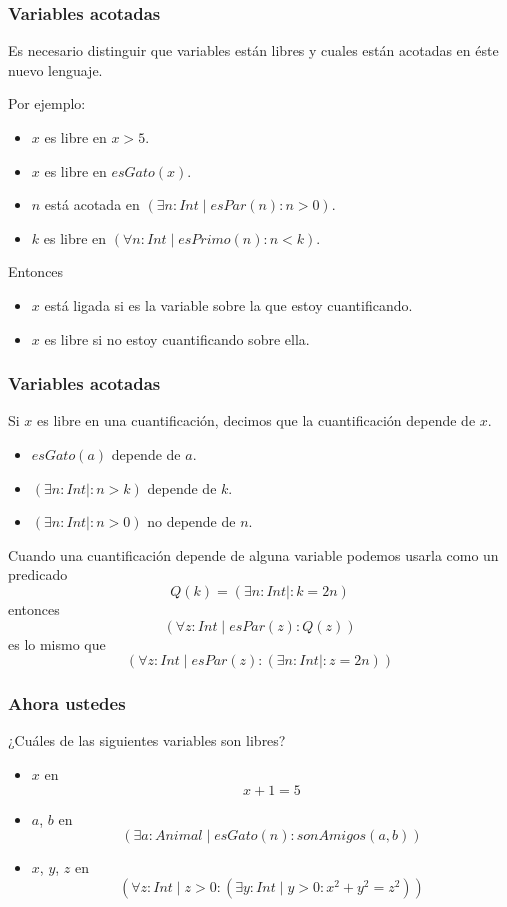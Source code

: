\documentclass{beamer}
\begin{document}
\begin{frame}[fragile]
    \frametitle{Variables acotadas}
    \pause
    Es necesario distinguir que variables están libres y cuales están acotadas en éste nuevo lenguaje.
    \pause

    Por ejemplo:
    \begin{itemize}
        \pause
        \item $x$ es libre en $x > 5$.
        \pause
        \item $x$ es libre en $esGato(x)$.
        \pause
        \item $n$ está acotada en $(\exists n: Int \mid esPar(n) : n > 0)$.
        \pause
        \item $k$ es libre en $(\forall n: Int \mid esPrimo(n) : n < k)$.
    \end{itemize}

    \pause
    Entonces
    \begin{itemize}
        \pause
        \item $x$ está ligada si es la variable sobre la que estoy cuantificando.
        \pause
        \item $x$ es libre si no estoy cuantificando sobre ella.
    \end{itemize}
\end{frame}

\begin{frame}[fragile]
    \frametitle{Variables acotadas} 
    \pause
    Si $x$ es libre en una cuantificación, decimos que la cuantificación depende de $x$.
    \begin{itemize}
        \pause
        \item $esGato(a)$ depende de $a$.
        \pause
        \item $(\exists n: Int \mid : n > k)$ depende de $k$.
        \pause
        \item $(\exists n: Int \mid : n > 0)$ no depende de $n$.
    \end{itemize}
    \pause
    Cuando una cuantificación depende de alguna variable podemos usarla como un predicado
        \pause
        $$Q(k) = (\exists n: Int \mid : k = 2n)$$
    \pause
    entonces
        \pause
        $$(\forall z: Int \mid esPar(z) : Q(z))$$
    \pause
    es lo mismo que
        \pause
        $$(\forall z: Int \mid esPar(z) : (\exists n: Int \mid : z = 2n))$$
\end{frame}

\begin{frame}[fragile]
    \frametitle{Ahora ustedes}
    \pause
    ¿Cuáles de las siguientes variables son libres?
    \begin{itemize}
        \pause
        \item $x$ en
            $$x + 1 = 5$$
        \pause
        \item $a$, $b$ en 
            $$(\exists a: Animal \mid esGato(n) : sonAmigos(a,b))$$
        \pause
        \item $x$, $y$, $z$ en 
            $$(\forall z: Int \mid z > 0 : (\exists y: Int \mid y > 0 : x^2+y^2=z^2))$$
    \end{itemize}
\end{frame}
\end{document}
